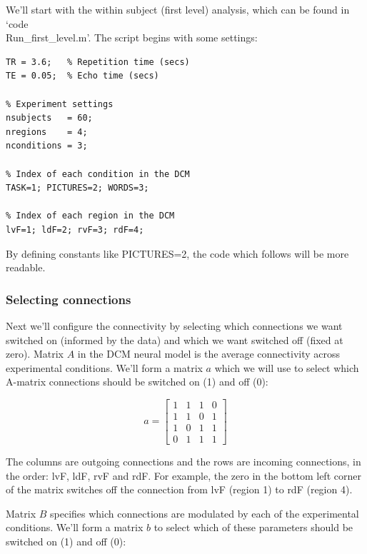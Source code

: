\documentclass{article}
\begin{document}
We'll start with the within subject (first level) analysis, which can be found in `code\\Run\_first\_level.m'. The script begins with some settings:

\begin{lstlisting}[style=Matlab-editor,caption=Settings]
% MRI scanner settings
TR = 3.6;   % Repetition time (secs)
TE = 0.05;  % Echo time (secs)

% Experiment settings
nsubjects   = 60;
nregions    = 4; 
nconditions = 3;

% Index of each condition in the DCM
TASK=1; PICTURES=2; WORDS=3;

% Index of each region in the DCM
lvF=1; ldF=2; rvF=3; rdF=4;
\end{lstlisting}

By defining constants like PICTURES=2, the code which follows will be more readable. 

\subsubsection{Selecting connections}

Next we'll configure the connectivity by selecting which connections we want switched on (informed by the data) and which we want switched off (fixed at zero). Matrix \(A\) in the DCM neural model is the average connectivity across experimental conditions. We'll form a matrix  \(a\) which we will use to select which A-matrix connections should be switched on (1) and off (0):

\[
 a=\begin{bmatrix}
  1 & 1 & 1 & 0 \\
  1 & 1 & 0 & 1 \\
  1 & 0 & 1 & 1 \\
  0 & 1 & 1 & 1
 \end{bmatrix}
\]

The columns are outgoing connections and the rows are incoming connections, in the order: lvF, ldF, rvF and rdF. For example, the zero in the bottom left corner of the matrix switches off the connection from lvF (region 1) to rdF (region 4). 

Matrix \(B\) specifies which connections are modulated by each of the experimental conditions. We'll form a matrix \(b\) to select which of these parameters should be switched on (1) and off (0):
\end{document}
